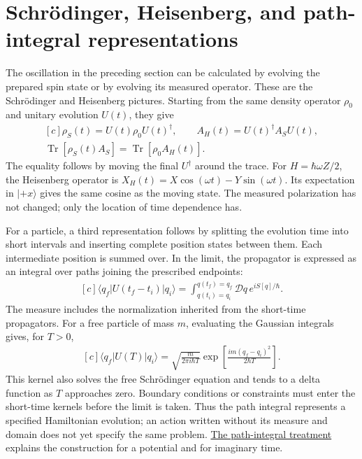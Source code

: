 \documentclass[11pt,oneside]{book}
\newenvironment{centeredalign}{\[\begin{gathered}[c]}{\end{gathered}\]}
\begin{document}
\section{Schrödinger, Heisenberg, and path-integral representations}


The oscillation in the preceding section can be calculated by evolving the
prepared spin state or by evolving its measured operator. These are the
Schr\"odinger and Heisenberg pictures. Starting from the same density operator
\(\rho_0\) and unitary evolution \(U(t)\), they give
\begin{centeredalign}
\rho_S(t)=U(t)\rho_0U(t)^\dagger,\qquad
A_H(t)=U(t)^\dagger A_SU(t),\\
\operatorname{Tr}[\rho_S(t)A_S]
=\operatorname{Tr}[\rho_0A_H(t)].
\end{centeredalign}
The equality follows by moving the final \(U^\dagger\) around the trace.
For \(H=\hbar\omega Z/2\), the Heisenberg operator is
\(X_H(t)=X\cos(\omega t)-Y\sin(\omega t)\). Its expectation in
\(|+x\rangle\) gives the same cosine as the moving state. The measured
polarization has not changed; only the location of time dependence has.

For a particle, a third representation follows by splitting the evolution
time into short intervals and inserting complete position states between
them. Each intermediate position is summed over. In the limit, the
propagator is expressed as an integral over paths joining the prescribed
endpoints:
\begin{centeredalign}
\langle q_f|U(t_f-t_i)|q_i\rangle
=\int_{q(t_i)=q_i}^{q(t_f)=q_f}\mathcal Dq\,e^{iS[q]/\hbar}.
\end{centeredalign}
The measure includes the normalization inherited from the short-time
propagators. For a free particle of mass \(m\), evaluating the Gaussian
integrals gives, for \(T>0\),
\begin{centeredalign}
\langle q_f|U(T)|q_i\rangle
=\sqrt{\frac{m}{2\pi i\hbar T}}
\exp\!\left[\frac{im(q_f-q_i)^2}{2\hbar T}\right].
\end{centeredalign}
This kernel also solves the free Schr\"odinger equation and tends to a delta
function as \(T\) approaches zero. Boundary conditions or constraints must
enter the short-time kernels before the limit is taken. Thus the path
integral represents a specified Hamiltonian evolution; an action written
without its measure and domain does not yet specify the same problem.
\hyperref[topic:path-integral-formulation]{The path-integral treatment}
explains the construction for a potential and for imaginary time.
\end{document}
